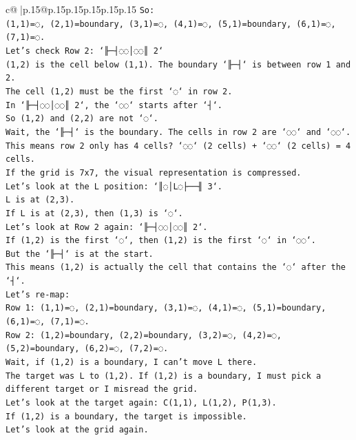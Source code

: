 \documentclass{article}
\begin{document}
{\begin{supertabular}{c@{$\;$}|p{.15\linewidth}@{}p{.15\linewidth}p{.15\linewidth}p{.15\linewidth}p{.15\linewidth}p{.15\linewidth}}
{{{\texttt{So:} \\
\texttt{(1,1)=◌, (2,1)=boundary, (3,1)=◌, (4,1)=◌, (5,1)=boundary, (6,1)=◌, (7,1)=◌.} \\
\texttt{Let's check Row 2: `╟─┤◌◌│◌◌║ 2`} \\
\texttt{(1,2) is the cell below (1,1). The boundary `╟─┤` is between row 1 and 2.} \\
\texttt{The cell (1,2) must be the first `◌` in row 2.} \\
\texttt{In `╟─┤◌◌│◌◌║ 2`, the `◌◌` starts after `┤`.} \\
\texttt{So (1,2) and (2,2) are not `◌`.} \\
\texttt{Wait, the `╟─┤` is the boundary. The cells in row 2 are `◌◌` and `◌◌`.} \\
\texttt{This means row 2 only has 4 cells? `◌◌` (2 cells) + `◌◌` (2 cells) = 4 cells.} \\
\texttt{If the grid is 7x7, the visual representation is compressed.} \\
\texttt{Let's look at the L position: `║◌│L◌├──╢ 3`.} \\
\texttt{L is at (2,3).} \\
\texttt{If L is at (2,3), then (1,3) is `◌`.} \\
\texttt{Let's look at Row 2 again: `╟─┤◌◌│◌◌║ 2`.} \\
\texttt{If (1,2) is the first `◌`, then (1,2) is the first `◌` in `◌◌`.} \\
\texttt{But the `╟─┤` is at the start.} \\
\texttt{This means (1,2) is actually the cell that contains the `◌` after the `┤`.} \\
\texttt{Let's re{-}map:} \\
\texttt{Row 1: (1,1)=◌, (2,1)=boundary, (3,1)=◌, (4,1)=◌, (5,1)=boundary, (6,1)=◌, (7,1)=◌.} \\
\texttt{Row 2: (1,2)=boundary, (2,2)=boundary, (3,2)=◌, (4,2)=◌, (5,2)=boundary, (6,2)=◌, (7,2)=◌.} \\
\texttt{Wait, if (1,2) is a boundary, I can't move L there.} \\
\texttt{The target was L to (1,2). If (1,2) is a boundary, I must pick a different target or I misread the grid.} \\
\texttt{Let's look at the target again: C(1,1), L(1,2), P(1,3).} \\
\texttt{If (1,2) is a boundary, the target is impossible.} \\
\texttt{Let's look at the grid again.} \\
}}}
\end{supertabular}}
\end{document}
